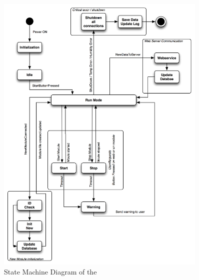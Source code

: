 	\begin{figure}[H]
		\begin{centering}
			 \includegraphics[width=0.9\textwidth]{images/statemachine.png}
		\caption{State Machine Diagram of the}
	 	\end{centering}
	\end{figure}
